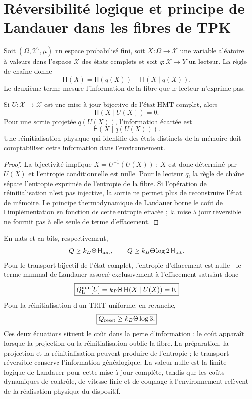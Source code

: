 \section{Réversibilité logique et principe de Landauer dans les fibres de TPK}
\label{sec:informacion-fibra-landauer-rev7}

Soit \((\Omega,2^\Omega,\mu)\) un espace probabilisé fini, soit \(X:\Omega\to\mathcal X\) une variable aléatoire à valeurs dans l’espace \(\mathcal X\) des états complets et soit \(q:\mathcal X\to Y\) un lecteur. La règle de chaîne donne
\[
 \mathsf H(X)
 =
 \mathsf H(q(X))+\mathsf H(X\mid q(X)).
\]
Le deuxième terme mesure l’information de la fibre que le lecteur n’exprime pas.

\begin{theorem}
\label{thm:landauer-relativo-lector-rev7}
Si \(U:\mathcal X\to\mathcal X\) est une mise à jour bijective de l’état HMT complet, alors
\[
 \boxed{\mathsf H(X\mid U(X))=0.}
\]
Pour une sortie projetée \(q(U(X))\), l’information écartée est
\[
 \mathsf H(X\mid q(U(X))).
\]
Une réinitialisation physique qui identifie des états distincts de la mémoire doit comptabiliser cette information dans l’environnement.
\end{theorem}

\begin{proof}
La bijectivité implique \(X=U^{-1}(U(X))\) ; \(X\) est donc déterminé par \(U(X)\) et l’entropie conditionnelle est nulle. Pour le lecteur \(q\), la règle de chaîne sépare l’entropie exprimée de l’entropie de la fibre. Si l’opération de réinitialisation n’est pas injective, la sortie ne permet plus de reconstruire l’état de mémoire. Le principe thermodynamique de Landauer borne le coût de l’implémentation en fonction de cette entropie effacée ; la mise à jour réversible ne fournit pas à elle seule de terme d’effacement.
\end{proof}

En nats et en bits, respectivement,
\[
 Q\ge k_B\Theta\,\mathsf H_{\rm nat},
 \qquad
 Q\ge k_B\Theta\log 2\,\mathsf H_{\rm bit}.
\]
Pour le transport bijectif de l’état complet, l’entropie d’effacement est nulle ; le terme minimal de Landauer associé exclusivement à l’effacement satisfait donc
\[
\boxed{Q_{\rm L}^{\min}[U]=k_B\Theta\,
 \mathsf H(X\mid U(X))=0.}
\]
Pour la réinitialisation d’un TRIT uniforme, en revanche,
\[
 \boxed{Q_{\rm reset}\ge k_B\Theta\log3.}
\]
Ces deux équations situent le coût dans la perte d’information : le coût apparaît lorsque la projection ou la réinitialisation oublie la fibre. La préparation, la projection et la réinitialisation peuvent produire de l’entropie ; le transport réversible conserve l’information généalogique. La valeur nulle est la limite logique de Landauer pour cette mise à jour complète, tandis que les coûts dynamiques de contrôle, de vitesse finie et de couplage à l’environnement relèvent de la réalisation physique du dispositif.

